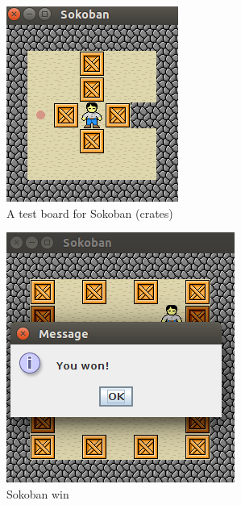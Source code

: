 \documentclass[a4paper]{article}
\begin{document}
	\begin{figure}[h]
		\centering
		\includegraphics[]{Sokoban.png}
		\caption{A test board for Sokoban (crates)}
	\end{figure}

	\begin{figure}
		\centering
		\includegraphics[]{Sokobanwin.png}
		\caption{Sokoban win}
	\end{figure}
	
\end{document}

